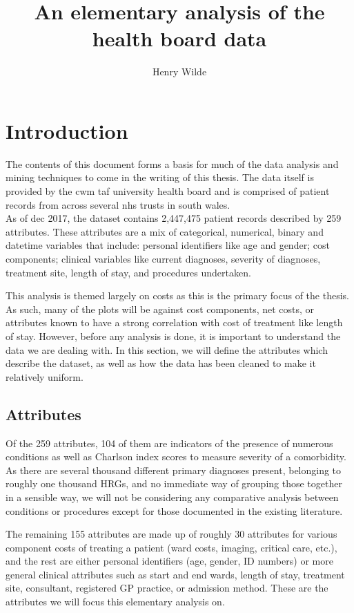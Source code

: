 \documentclass{article}
\title{An elementary analysis of the health board data}
\author{Henry Wilde}
\begin{document}
\maketitle




\section{Introduction}\label{section:intro}

The contents of this document forms a basis for much of the data analysis and
mining techniques to come in the writing of this thesis. The data itself is
provided by the cwm taf university health board and is comprised of patient
records from across several nhs trusts in south wales. \\

As of dec 2017, the dataset contains 2,447,475 patient records described by 259
attributes. These attributes are a mix of categorical, numerical, binary and
datetime variables that include: personal identifiers like age and gender; cost
components; clinical variables like current diagnoses, severity of diagnoses,
treatment site, length of stay, and procedures undertaken.

This analysis is themed largely on costs as this is the primary focus of the
thesis. As such, many of the plots will be against cost components, net costs,
or attributes known to have a strong correlation with cost of treatment like
length of stay. However, before any analysis is done, it is important to 
understand the data we are dealing with. In this section, we will define the 
attributes which describe the dataset, as well as how the data has been cleaned
to make it relatively uniform. 


\subsection{Attributes}\label{subsection:attributes}

Of the 259 attributes, 104 of them are indicators of the presence of numerous
conditions as well as Charlson index scores to measure severity of a
comorbidity. As there are several thousand different primary diagnoses present, 
belonging to roughly one thousand HRGs, and no immediate way of grouping those
together in a sensible way, we will not be considering any comparative analysis
between conditions or procedures except for those documented in the existing
literature.

The remaining 155 attributes are made up of roughly 30 attributes for various
component costs of treating a patient (ward costs, imaging, critical care,
etc.), and the rest are either personal identifiers (age, gender, ID numbers) or
more general clinical attributes such as start and end wards, length of stay,
treatment site, consultant, registered GP practice, or admission method. These
are the attributes we will focus this elementary analysis on.
\end{document}
